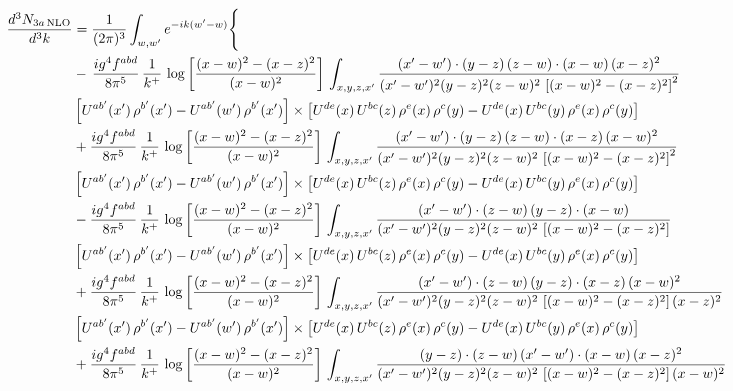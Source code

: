 \documentclass[10pt]{article}
\numberwithin{equation}{section}
\begin{document}
\begin{align}
\frac{d^{3}N_{3a\,\rm NLO}}{d^{3}k} & = \frac{1}{(2\pi)^{3}}\int_{w,w'}e^{-ik(w'-w)}\Bigg\{\notag \\
& -\,\frac{ig^{4}f^{abd}}{8\pi^{5}}\,\frac{1}{k^{+}}\,\log{\left[\frac{(x-w)^{2}-(x-z)^{2}}{(x-w)^{2}}\right]}\,\int_{x,y,z,x'}
\frac{(x'-w')\cdot(y-z)\,(z-w)\cdot(x-w)\,(x-z)^{2}}{(x'-w')^{2}(y-z)^{2}(z-w)^{2}\,\left[(x-w)^{2}-(x-z)^{2}\right]^{2}}\notag \\ & \left[U^{ab'}(x')\,\rho^{b'}(x')-U^{ab'}(w')\, \rho^{b'}(x')\right]\times \left[U^{de}(x)\,U^{bc}(z)\, \rho^{e}(x)\,\rho^{c}(y)-U^{de}(x)\,U^{bc}(y)\,\rho^{e}(x)\,\rho^{c}(y)\right] \notag \\
& +\frac{ig^{4}f^{abd}}{8\pi^{5}}\,\frac{1}{k^{+}}\,\log{\left[\frac{(x-w)^{2}-(x-z)^{2}}{(x-w)^{2}}\right]}\,\int_{x,y,z,x'}
\frac{(x'-w')\cdot(y-z)\,(z-w)\cdot(x-z)\,(x-w)^{2}}{(x'-w')^{2}(y-z)^{2}(z-w)^{2}\,\left[(x-w)^{2}-(x-z)^{2}\right]^{2}}\notag \\ 
&\left[U^{ab'}(x')\,\rho^{b'}(x')-U^{ab'}(w')\, \rho^{b'}(x')\right]\times \left[U^{de}(x)\,U^{bc}(z)\, \rho^{e}(x)\,\rho^{c}(y)-U^{de}(x)\,U^{bc}(y)\,\rho^{e}(x)\,\rho^{c}(y)\right] \notag \\
& -\frac{ig^{4}f^{abd}}{8\pi^{5}}\,\frac{1}{k^{+}}\,\log{\left[\frac{(x-w)^{2}-(x-z)^{2}}{(x-w)^{2}}\right]}\,\int_{x,y,z,x'}
\frac{(x'-w')\cdot(z-w)\,(y-z)\cdot(x-w)}{(x'-w')^{2}(y-z)^{2}(z-w)^{2}\,\left[(x-w)^{2}-(x-z)^{2}\right]}\notag \\ & \left[U^{ab'}(x')\,\rho^{b'}(x')-U^{ab'}(w')\, \rho^{b'}(x')\right]\times \left[U^{de}(x)\,U^{bc}(z)\, \rho^{e}(x)\,\rho^{c}(y)-U^{de}(x)\,U^{bc}(y)\,\rho^{e}(x)\,\rho^{c}(y)\right] \notag \\
&  +\frac{ig^{4}f^{abd}}{8\pi^{5}}\,\frac{1}{k^{+}}\,\log{\left[\frac{(x-w)^{2}-(x-z)^{2}}{(x-w)^{2}}\right]}\,\int_{x,y,z,x'}
\frac{(x'-w')\cdot(z-w)\,(y-z)\cdot(x-z)\,(x-w)^{2}}{(x'-w')^{2}(y-z)^{2}(z-w)^{2}\,\left[(x-w)^{2}-(x-z)^{2}\right](x-z)^{2}}\notag \\ & \left[U^{ab'}(x')\,\rho^{b'}(x')-U^{ab'}(w')\, \rho^{b'}(x')\right]\times \left[U^{de}(x)\,U^{bc}(z)\, \rho^{e}(x)\,\rho^{c}(y)-U^{de}(x)\,U^{bc}(y)\,\rho^{e}(x)\,\rho^{c}(y)\right] \notag \\
& +\frac{ig^{4}f^{abd}}{8\pi^{5}}\,\frac{1}{k^{+}}\,\log{\left[\frac{(x-w)^{2}-(x-z)^{2}}{(x-w)^{2}}\right]}\,\int_{x,y,z,x'}
\frac{(y-z)\cdot(z-w)\,(x'-w')\cdot(x-w)\,(x-z)^{2}}{(x'-w')^{2}(y-z)^{2}(z-w)^{2}\,\left[(x-w)^{2}-(x-z)^{2}\right](x-w)^{2}}\notag \\ 

\end{align}
\end{document}
